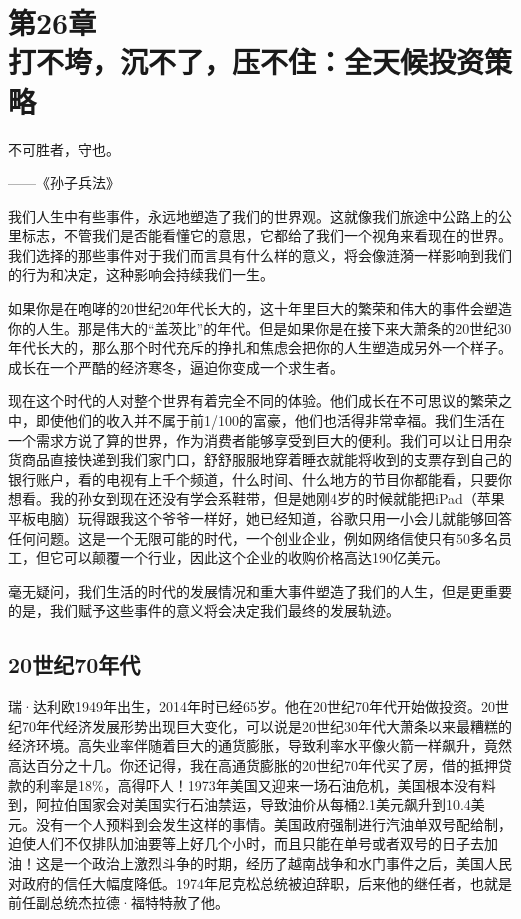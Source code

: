 
\section[第26章\q 打不垮，沉不了，压不住：全天候投资策略]{第26章\\ 打不垮，沉不了，压不住：全天候投资策略}

\begin{BookQuote}
不可胜者，守也。

\hfill ——《孙子兵法》
\end{BookQuote}

我们人生中有些事件，永远地塑造了我们的世界观。这就像我们旅途中公路上的公里标志，不管我们是否能看懂它的意思，它都给了我们一个视角来看现在的世界。我们选择的那些事件对于我们而言具有什么样的意义，将会像涟漪一样影响到我们的行为和决定，这种影响会持续我们一生。

如果你是在咆哮的20世纪20年代长大的，这十年里巨大的繁荣和伟大的事件会塑造你的人生。那是伟大的“盖茨比”的年代。但是如果你是在接下来大萧条的20世纪30年代长大的，那么那个时代充斥的挣扎和焦虑会把你的人生塑造成另外一个样子。成长在一个严酷的经济寒冬，逼迫你变成一个求生者。

现在这个时代的人对整个世界有着完全不同的体验。他们成长在不可思议的繁荣之中，即使他们的收入并不属于前1/100的富豪，他们也活得非常幸福。我们生活在一个需求方说了算的世界，作为消费者能够享受到巨大的便利。我们可以让日用杂货商品直接快递到我们家门口，舒舒服服地穿着睡衣就能将收到的支票存到自己的银行账户，看的电视有上千个频道，什么时间、什么地方的节目你都能看，只要你想看。我的孙女到现在还没有学会系鞋带，但是她刚4岁的时候就能把iPad（苹果平板电脑）玩得跟我这个爷爷一样好，她已经知道，谷歌只用一小会儿就能够回答任何问题。这是一个无限可能的时代，一个创业企业，例如网络信使只有50多名员工，但它可以颠覆一个行业，因此这个企业的收购价格高达190亿美元。

毫无疑问，我们生活的时代的发展情况和重大事件塑造了我们的人生，但是更重要的是，我们赋予这些事件的意义将会决定我们最终的发展轨迹。

\subsection{20世纪70年代}

瑞·达利欧1949年出生，2014年时已经65岁。他在20世纪70年代开始做投资。20世纪70年代经济发展形势出现巨大变化，可以说是20世纪30年代大萧条以来最糟糕的经济环境。高失业率伴随着巨大的通货膨胀，导致利率水平像火箭一样飙升，竟然高达百分之十几。你还记得，我在高通货膨胀的20世纪70年代买了房，借的抵押贷款的利率是18\%，高得吓人！1973年美国又迎来一场石油危机，美国根本没有料到，阿拉伯国家会对美国实行石油禁运，导致油价从每桶2.1美元飙升到10.4美元。没有一个人预料到会发生这样的事情。美国政府强制进行汽油单双号配给制，迫使人们不仅排队加油要等上好几个小时，而且只能在单号或者双号的日子去加油！这是一个政治上激烈斗争的时期，经历了越南战争和水门事件之后，美国人民对政府的信任大幅度降低。1974年尼克松总统被迫辞职，后来他的继任者，也就是前任副总统杰拉德·福特特赦了他。

